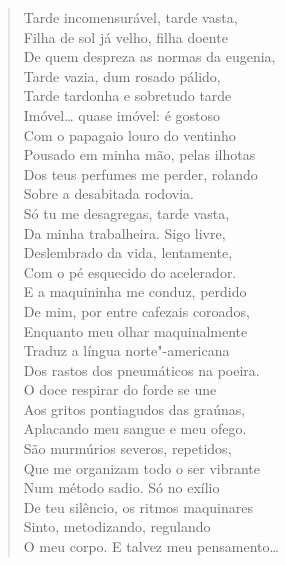\begin{verse}
Tarde incomensurável, tarde vasta,\\
Filha de sol já velho, filha doente\\
De quem despreza as normas da eugenia,\\
Tarde vazia, dum rosado pálido,\\
Tarde tardonha e sobretudo tarde\\
Imóvel\ldots{} quase imóvel: é gostoso\\
Com o papagaio louro do ventinho\\
Pousado em minha mão, pelas ilhotas\\
Dos teus perfumes me perder, rolando\\
Sobre a desabitada rodovia.\\
Só tu me desagregas, tarde vasta,\\
Da minha trabalheira. Sigo livre,\\
Deslembrado da vida, lentamente,\\
Com o pé esquecido do acelerador.\\
E a maquininha me conduz, perdido\\
De mim, por entre cafezais coroados,\\
Enquanto meu olhar maquinalmente\\
Traduz a língua norte"-americana\\
Dos rastos dos pneumáticos na poeira.\\
O doce respirar do forde se une\\
Aos gritos pontiagudos das graúnas,\\
Aplacando meu sangue e meu ofego.\\
São murmúrios severos, repetidos,\\
Que me organizam todo o ser vibrante\\
Num método sadio. Só no exílio\\
De teu silêncio, os ritmos maquinares\\
Sinto, metodizando, regulando\\
O meu corpo. E talvez meu pensamento\ldots{}


\end{verse}
